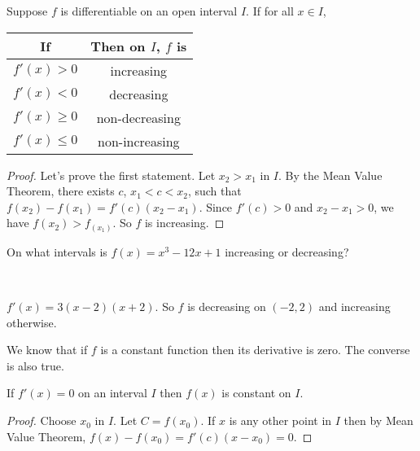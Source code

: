 \documentclass[../calc1-main.tex]{subfiles}
\begin{document}
  \begin{theorem}
    Suppose $f$ is differentiable on an open interval $I$. If for all $x \in I$,
    \begin{table}[H]
      \centering
      \begin{tabular}{|c|c|}
        \hline
        If & Then on $I$, $f$ is \\
        \hline
        $f'(x) > 0$ & increasing \\
        $f'(x) < 0$ & decreasing \\
        $f'(x) \ge 0$ & non-decreasing \\
        $f'(x) \le 0$ & non-increasing \\
        \hline
      \end{tabular}
    \end{table}

  \end{theorem}
  \begin{proof}
    Let's prove the first statement. Let $x_2 > x_1$ in $I$. By the Mean Value Theorem, there exists $c$, $x_1< c < x_2$, such that $f(x_2) - f(x_1) = f'(c) (x_2 - x_1)$. Since $f'(c)>0$  and $x_2-x_1>0$, we have $f(x_2) > f_(x_1)$. So $f$ is increasing.
  \end{proof}

  \begin{example}
    On what intervals is $f(x) = x^3 - 12 x + 1$ increasing or decreasing?
  \end{example}
  \begin{solution}
    ~\\
    \begin{minipage}{0.5\textwidth}
      $f'(x) = 3(x-2)(x+2)$. So $f$ is decreasing on $(-2, 2)$ and increasing otherwise.
    \end{minipage}%
    \begin{minipage}{0.5\textwidth}
      \begin{figure}[H]
        \centering
        
      \end{figure}
    \end{minipage}

  \end{solution}

  We know that if $f$ is a constant function then its derivative is zero. The converse is also true.
  \begin{theorem} \label{THM: functions with zero derivative are constant}
    If $f'(x) = 0$ on an interval $I$ then $f(x)$ is constant on $I$.
  \end{theorem}
  \begin{proof}
    Choose $x_0$ in $I$. Let $C = f(x_0)$. If $x$ is any other point in $I$ then by Mean Value Theorem, $f(x) - f(x_0) = f'(c) (x-x_0) = 0$.
  \end{proof}
\end{document}
